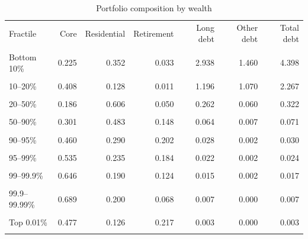 \begin{table}[htbp]\centering\small
\caption{Portfolio composition by wealth}
\label{tab:portfolio_comp_standard_fractiles_pooled}
\begin{tabular}{lrrrrrr}\toprule
Fractile & Core & Residential & Retirement & Long debt & Other debt & Total debt \\\\ \midrule
Bottom 10\% & 0.225 & 0.352 & 0.033 & 2.938 & 1.460 & 4.398 \\\\
10--20\% & 0.408 & 0.128 & 0.011 & 1.196 & 1.070 & 2.267 \\\\
20--50\% & 0.186 & 0.606 & 0.050 & 0.262 & 0.060 & 0.322 \\\\
50--90\% & 0.301 & 0.483 & 0.148 & 0.064 & 0.007 & 0.071 \\\\
90--95\% & 0.460 & 0.290 & 0.202 & 0.028 & 0.002 & 0.030 \\\\
95--99\% & 0.535 & 0.235 & 0.184 & 0.022 & 0.002 & 0.024 \\\\
99--99.9\% & 0.646 & 0.190 & 0.124 & 0.015 & 0.002 & 0.017 \\\\
99.9--99.99\% & 0.689 & 0.200 & 0.068 & 0.007 & 0.000 & 0.007 \\\\
Top 0.01\% & 0.477 & 0.126 & 0.217 & 0.003 & 0.000 & 0.003 \\\\
\bottomrule
\end{tabular}
\end{table}
